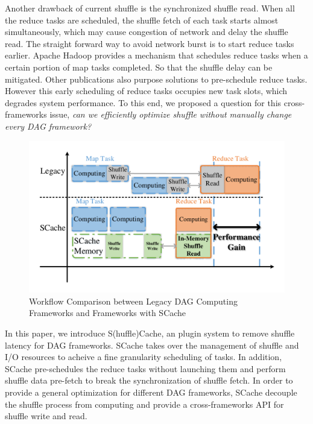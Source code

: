 Another drawback of current shuffle is the synchronized shuffle read. When all the reduce tasks are scheduled, the shuffle fetch of each task starts almost simultaneously, which may cause congestion of network and delay the shuffle read. The straight forward way to avoid network burst is to start reduce tasks earlier. Apache Hadoop\cite{hadoop} provides a mechanism that schedules reduce tasks when a certain portion of map tasks completed. So that the shuffle delay can be mitigated. Other publications also purpose solutions to pre-schedule reduce tasks\cite{ihadoop, ishuffle, dynmr}. However this early scheduling of reduce tasks occupies new task slots, which degrades system performance. To this end, we proposed a question for this cross-frameworks issue, \textit{can we efficiently optimize shuffle without manually change every DAG framework?} 

\begin{figure}
	\centering
	\includegraphics[width=\linewidth]{fig/workflow}
	\caption{Workflow Comparison between Legacy DAG Computing Frameworks and Frameworks with SCache}
	\label{fig:workflow}
\end{figure}




In this paper, we introduce S(huffle)Cache, an plugin system to remove shuffle latency for DAG frameworks. SCache takes over the management of shuffle and I/O resources to acheive a fine granularity scheduling of tasks. In addition, SCache pre-schedules the reduce tasks without launching them and perform shuffle data pre-fetch to break the synchronization of shuffle fetch. In order to provide a general optimization for different DAG frameworks, SCache decouple the shuffle process from computing and  provide a cross-frameworks API for shuffle write and read. 

